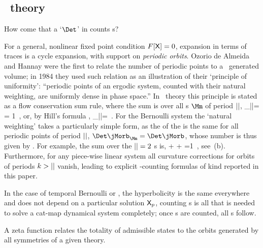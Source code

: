 \subsection{\Po\ theory}
\label{s:PoThe}

How come that a `$\Det$' in  counts {\lattstate}s?

For a general, nonlinear fixed point condition $F[\mathsf{X}]=0$, expansion
 in terms of traces is a cycle
expansion, with support on \emph{periodic orbits}.
Ozorio de Almeida and Hannay were the first to relate the
number of periodic points to a \JacobianM\ generated volume; in 1984 they
used such relation as an illustration of their `principle of uniformity':
``periodic points of an ergodic system, counted with their natural
weighting, are uniformly dense in phase space.'' In \po\
theory this principle is stated as a
 {flow
conservation} sum rule, where the sum is over all {\lattstate}s $\Mm$ of
period ${||}$,
\beq
\sum_{|\Mm|=\cl{}}
    \;= 1
\,,
\label{H-OdeA_mapsOrb}
\eeq
or, by Hill's formula ,
\beq
\sum_{|\Mm|=\cl{}}
\,.
\label{Det(jMorb)eights}
\eeq
For the Bernoulli system the `natural weighting' takes a particularly
simple form, as the {\HillDet} of the {\jacobianOrb} is the same for all
periodic points of period ${||}$, $\Det\jMorb_\Mm=\Det\jMorb$, whose
number is thus given by \refeq{detBern0}.
For example, the sum over the ${||}=2$ {\lattstate}s is,
\beq
   +    
   + 
    =1
\,,
see \,(b).
Furthermore, for any piece-wise
linear system all curvature corrections for orbits of
periods $k>{||}$ vanish, leading to explicit {\lattstate}-counting
formulas of kind reported in this paper.

In the case of temporal Bernoulli or \templatt, the hyperbolicity is the same
everywhere and does not depend on a particular solution $\mathsf{X}_p$, counting
\po s is all that is needed to solve a cat-map dynamical system
completely; once \po s are counted, all {\cycForm s}\rf{CBtrace} follow.

A zeta function relates the totality of admissible states to the orbits
generated by all symmetries of a given theory.

